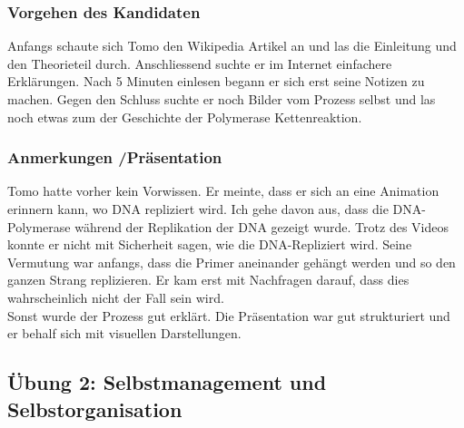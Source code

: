 \subsubsection{Vorgehen des Kandidaten} \label{bemtom}
Anfangs schaute sich Tomo den Wikipedia Artikel an und las die Einleitung und den Theorieteil durch.  Anschliessend suchte er im Internet einfachere Erklärungen. Nach 5 Minuten einlesen begann er sich erst seine Notizen zu machen. Gegen den Schluss suchte er noch Bilder vom Prozess selbst und las noch etwas zum der Geschichte der Polymerase Kettenreaktion.
\newpage
\subsubsection{Anmerkungen /Präsentation} \label{bemtom}

Tomo hatte vorher kein Vorwissen. Er meinte, dass er sich an eine Animation erinnern kann, wo DNA repliziert wird. Ich gehe davon aus, dass die DNA-Polymerase während der Replikation der DNA gezeigt wurde. Trotz des Videos konnte er nicht mit Sicherheit sagen, wie die DNA-Repliziert wird. Seine Vermutung war anfangs, dass die Primer aneinander gehängt werden und so den ganzen Strang replizieren. Er kam erst mit Nachfragen darauf, dass dies wahrscheinlich nicht der Fall sein wird. \\
Sonst wurde der Prozess gut erklärt. Die Präsentation war gut strukturiert und er behalf sich mit visuellen Darstellungen.
\vspace{0.5cm}

\subsection{Übung 2: Selbstmanagement und Selbstorganisation}
